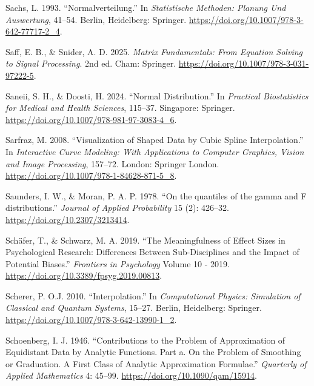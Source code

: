\documentclass[
]{article}
\newlength{\cslhangindent}
\newlength{\cslentryspacingunit} %
\newenvironment{CSLReferences}[2] %
 {%
  \setlength{\parindent}{0pt}
  \ifodd #1
  \let\oldpar\par
  \def\par{\hangindent=\cslhangindent\oldpar}
  \fi
  \setlength{\parskip}{#2\cslentryspacingunit}
 }%
 {}
\begin{document}
\begin{CSLReferences}{1}{0}
\leavevmode{}%
Sachs, L. 1993. {``Normalverteilung.''} In \emph{Statistische Methoden:
Planung Und Auswertung}, 41--54. Berlin, Heidelberg: Springer.
\url{https://doi.org/10.1007/978-3-642-77717-2_4}.

\leavevmode{}%
Saff, E. B., \& Snider, A. D. 2025. \emph{Matrix Fundamentals: From
Equation Solving to Signal Processing}. 2nd ed. Cham: Springer.
\url{https://doi.org/10.1007/978-3-031-97222-5}.

\leavevmode{}%
Saneii, S. H., \& Doosti, H. 2024. {``Normal Distribution.''} In
\emph{Practical Biostatistics for Medical and Health Sciences}, 115--37.
Singapore: Springer. \url{https://doi.org/10.1007/978-981-97-3083-4_6}.

\leavevmode{}%
Sarfraz, M. 2008. {``Visualization of Shaped Data by Cubic Spline
Interpolation.''} In \emph{Interactive Curve Modeling: With Applications
to Computer Graphics, Vision and Image Processing}, 157--72. London:
Springer London. \url{https://doi.org/10.1007/978-1-84628-871-5_8}.

\leavevmode{}%
Saunders, I. W., \& Moran, P. A. P. 1978. {``{On the quantiles of the
gamma and F distributions}.''} \emph{Journal of Applied Probability} 15
(2): 426--32. \url{https://doi.org/10.2307/3213414}.

\leavevmode{}%
Schäfer, T., \& Schwarz, M. A. 2019. {``The Meaningfulness of Effect
Sizes in Psychological Research: Differences Between Sub-Disciplines and
the Impact of Potential Biases.''} \emph{Frontiers in Psychology} Volume
10 - 2019. \url{https://doi.org/10.3389/fpsyg.2019.00813}.

\leavevmode{}%
Scherer, P. O.J. 2010. {``Interpolation.''} In \emph{Computational
Physics: Simulation of Classical and Quantum Systems}, 15--27. Berlin,
Heidelberg: Springer. \url{https://doi.org/10.1007/978-3-642-13990-1_2}.

\leavevmode{}%
Schoenberg, I. J. 1946. {``Contributions to the Problem of Approximation
of Equidistant Data by Analytic Functions. Part a. On the Problem of
Smoothing or Graduation. A First Class of Analytic Approximation
Formulae.''} \emph{Quarterly of Applied Mathematics} 4: 45--99.
\url{https://doi.org/10.1090/qam/15914}.


\end{CSLReferences}
\end{document}
